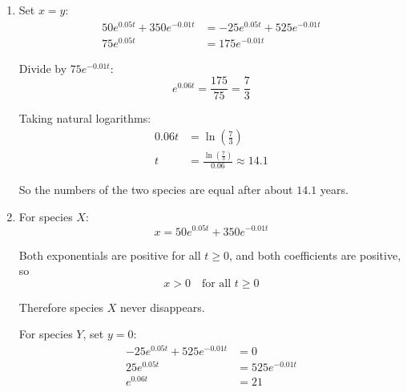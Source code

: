 \documentclass[leqno]{article}
\begin{document}
\begin{enumerate}[
  label=\textbf{\arabic*.},
  leftmargin=*,
  topsep=0pt,
  partopsep=0pt,
  parsep=0pt
]
\begin{djsSolution}
\begin{enumerate}[label=\textbf{(\alph*)}]
\begin{enumerate}[label=(\roman*)]
    So
    \begin{align*}
    x&=\frac14(200)e^{0.05t}+\frac14(1400)e^{-0.01t} \\
    &=50e^{0.05t}+350e^{-0.01t}
    \end{align*}

    and
    \begin{align*}
    y&=-\frac18(200)e^{0.05t}+\frac38(1400)e^{-0.01t} \\
    &=-25e^{0.05t}+525e^{-0.01t}
    \end{align*}

    At $t=25$:
    \begin{align*}
    x(25)&=50e^{1.25}+350e^{-0.25}\approx 447.1 \\
    y(25)&=-25e^{1.25}+525e^{-0.25}\approx 321.6
    \end{align*}

    So after $25$ years the model predicts about $447$ of species $X$ and about $322$ of species $Y$.

    \item Set $x=y$:
    \begin{align*}
    50e^{0.05t}+350e^{-0.01t}&=-25e^{0.05t}+525e^{-0.01t} \\
    75e^{0.05t}&=175e^{-0.01t}
    \end{align*}

    Divide by $75e^{-0.01t}$:
    \[
    e^{0.06t}=\frac{175}{75}=\frac73
    \]

    Taking natural logarithms:
    \begin{align*}
    0.06t&=\ln\left(\frac73\right) \\
    t&=\frac{\ln\left(\frac{7}{3}\right)}{0.06}\approx 14.1
    \end{align*}

    So the numbers of the two species are equal after about $14.1$ years.

    \item For species $X$:
    \[
    x=50e^{0.05t}+350e^{-0.01t}
    \]

    Both exponentials are positive for all $t\geq 0$, and both coefficients are positive, so
    \[
    x>0\quad \text{for all } t\geq 0
    \]

    Therefore species $X$ never disappears.

    For species $Y$, set $y=0$:
    \begin{align*}
    -25e^{0.05t}+525e^{-0.01t}&=0 \\
    25e^{0.05t}&=525e^{-0.01t} \\
    e^{0.06t}&=21
    \end{align*}


\end{enumerate}
\end{enumerate}
\end{djsSolution}
\end{enumerate}
\end{document}
